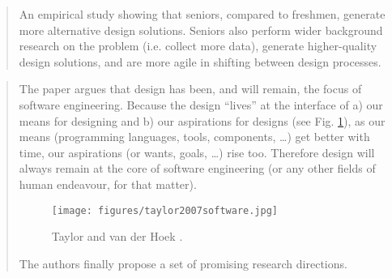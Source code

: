 		\begin{quote}
		\small
		An empirical study showing that seniors, compared to freshmen, generate more alternative 
		design solutions. Seniors also perform wider background research on the problem (i.e. collect more data),
		generate higher-quality design solutions, and are more agile in shifting between design processes.
		\end{quote}

		\begin{quote}
		\small
		The paper argues that design has been, and will remain, the focus of software engineering.
		Because the design ``lives'' at the interface of 
		a) our means for designing and 
		b) our aspirations for designs (see Fig. \ref{fig:taylor2007software}),
		as our means (programming languages, tools, components, \dots) get better with time,
		our aspirations (or wants, goals, \dots) rise too.
		Therefore design will always remain at the core of software engineering (or any other
		fields of human endeavour, for that matter).
		\begin{figure}[htb]
		\begin{center}
		\texttt{[image: figures/taylor2007software.jpg]}
		\caption{Taylor and van der Hoek \cite{taylor2007software}.}
		\label{fig:taylor2007software}
		\end{center}
		\end{figure}		
		The authors finally propose a set of promising research directions.
		\end{quote}

